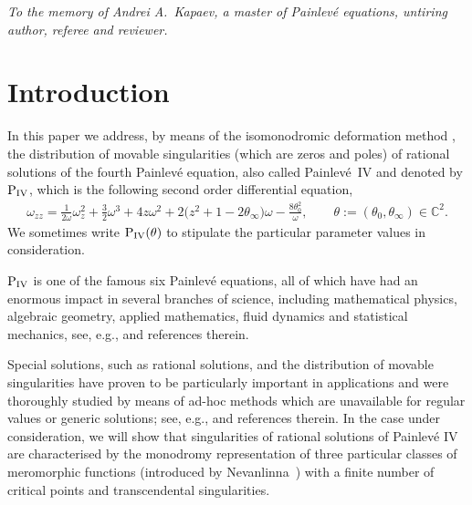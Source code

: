 \documentclass[pdftex]{sigma}
\numberwithin{equation}{section}
\newcommand{\om}{\omega}
\begin{document}


\begin{flushright}
 \begin{minipage}{95mm}\it
	To the memory of Andrei A.~Kapaev, a master of Pain\-lev\'e equations, untiring author, referee and reviewer.
\end{minipage}
\end{flushright}

\renewcommand{\thefootnote}{\arabic{footnote}}
\setcounter{footnote}{0}

\section{Introduction}

In this paper we address, by means of the isomonodromic deformation method \cite{fokas,its86,jimbomiwaII1981}, the distribution of movable singularities (which are zeros and poles) of rational solutions of the fourth Painlev\'e equation, also called Painlev\'e~IV and denoted by ${\rm P}_{\rm IV}$, which is the following second order dif\/ferential equation,
\begin{gather}\label{eq:piv}
\om_{zz}=\displaystyle\frac{1}{2\om}\om_z^2+ \frac{3}{2} \om^3 + 4 z\om^2+2\big(z^2+1-2\theta_\infty\big)\om-\frac{8\theta_0^2}{\om}
,\qquad \theta:=(\theta_0,\theta_\infty) \in \mathbb{C}^2.
\end{gather}
We sometimes write ${\rm P}_{\rm IV}(\theta)$ to stipulate the particular parameter values in consideration.

${\rm P}_{\rm IV}$ is one of the famous six Painlev\'e equations, all of which have had an enormous impact in several branches of science,
including mathematical physics, algebraic
geometry, applied mathematics, f\/luid dynamics and statistical mechanics, see, e.g.,
\cite{deifttalk,dubrovintopological,fokasquantum} and references therein.

Special solutions, such as rational solutions, and the distribution of movable singularities have proven to be
particularly important in applications and were thoroughly
studied by means of ad-hoc methods which are unavailable for regular values or generic solutions; see, e.g.,
\cite{bertolavorob,costin12,dubrovinmazzocco,piwkb, noumi} and references therein. In the case under
consideration, we will show that singularities of rational solutions of Painlev\'e IV are characterised by the
monodromy representation of three particular classes of meromorphic
functions (introduced by Nevanlinna~\cite{nevanlinna32}) with a f\/inite number of critical points and transcendental singularities.
\end{document}
